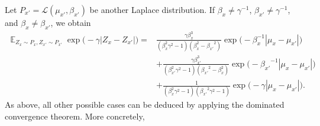 \documentclass{article}
\DeclareMathOperator{\Exp}{\mathbb{E}}
\begin{document}
Let $P_{x'} = \mathcal{L}(\mu_{x'}, \beta_{x'})$ be
another Laplace distribution. If $\beta_x \neq \gamma^{-1}$,
$\beta_{x'} \neq \gamma^{-1}$, and $\beta_x \neq \beta_{x'}$,
we obtain
\begin{equation*}
    \begin{split}
        \Exp_{Z_x \sim P_x, Z_{x'} \sim P_{x'}} \exp{\big(-\gamma |Z_x-Z_{x'}|\big)} ={}& \frac{\gamma \beta_x^3 }{(\beta_x^2 \gamma^2 - 1)(\beta_x^2-{\beta_{x'}}^2)} \exp{\big(-\beta_x^{-1} |\mu_x-\mu_{x'}|\big)} \\
        &+ \frac{\gamma \beta_{x'}^3}{(\beta_{x'}^2 \gamma^2 - 1)({\beta_{x'}}^2-\beta_x^2)} \exp{\big(-{\beta_{x'}}^{-1} |\mu_x-\mu_{x'}|\big)} \\
        &+ \frac{1}{(\beta_x^2 \gamma^2 - 1)({\beta_{x'}}^2 \gamma^2 - 1)} \exp{\big(-\gamma |\mu_x-\mu_{x'}| \big)}.
    \end{split}
\end{equation*}
As above, all other possible cases can be deduced by applying
the dominated convergence theorem. More concretely,
\end{document}
